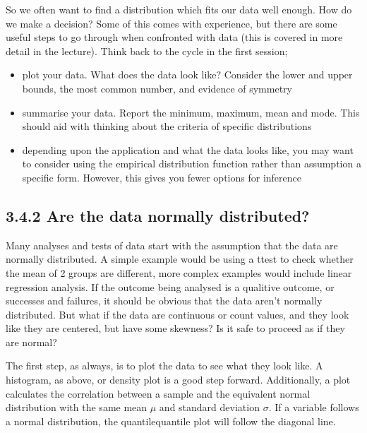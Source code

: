 \documentclass[letterpaper,10pt,english]{jupyterBook}
\begin{document}
\sphinxAtStartPar
So we often want to find a distribution which fits our data well enough. How do we make a decision? Some of this comes with experience, but there are some useful steps to go through when confronted with data (this is covered in more detail in the lecture). Think back to the  cycle in the first session;
\begin{itemize}
\item {} 
\sphinxAtStartPar
plot your data. What does the data look like? Consider the lower and upper bounds, the most common number, and evidence of symmetry

\item {} 
\sphinxAtStartPar
summarise your data. Report the minimum, maximum, mean and mode. This should aid with thinking about the criteria of specific distributions

\item {} 
\sphinxAtStartPar
depending upon the application and what the data looks like, you may want to consider using the empirical distribution function rather than assumption a specific form. However, this gives you fewer options for inference

\end{itemize}


\subsection{3.4.2 Are the data normally distributed?}
\label{\detokenize{03.e. Continuous Probability Distributions:id1}}
\sphinxAtStartPar
Many analyses and tests of data start with the assumption that the data are normally distributed. A simple example would be using a t\sphinxhyphen{}test to check whether the mean of 2 groups are different, more complex examples would include linear regression analysis. If the outcome being analysed is a qualitive outcome, or successes and failures, it should be obvious that the data aren’t normally distributed. But what if the data are continuous or count values, and they look like they are centered, but have some skewness? Is it safe to proceed as if they are normal?

\sphinxAtStartPar
The first step, as always, is to plot the data to see what they look like. A histogram, as above, or density plot is a good step forward. Additionally, a  plot calculates the correlation between a sample and the equivalent normal distribution with the same mean \(\mu\) and standard deviation \(\sigma\). If a variable follows a normal distribution, the quantile\sphinxhyphen{}quantile plot will follow the diagonal line.
\end{document}

